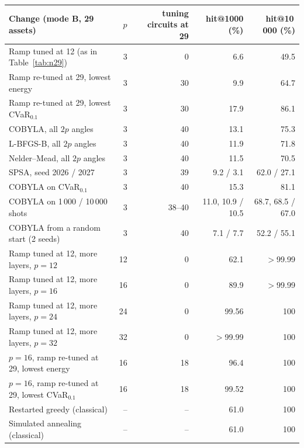 \begin{tabular}{@{}lrrrr@{}}\toprule
Change (mode B, 29 assets) & $p$ & tuning circuits at 29 & hit@1000 (\%) & hit@10\,000 (\%)\\\midrule
Ramp tuned at 12 (as in Table~\ref{tab:n29}) & 3 & 0 & 6.6 & 49.5\\
Ramp re-tuned at 29, lowest energy & 3 & 30 & 9.9 & 64.7\\
Ramp re-tuned at 29, lowest CVaR$_{0.1}$ & 3 & 30 & 17.9 & 86.1\\
COBYLA, all $2p$ angles & 3 & 40 & 13.1 & 75.3\\
L-BFGS-B, all $2p$ angles & 3 & 40 & 11.9 & 71.8\\
Nelder--Mead, all $2p$ angles & 3 & 40 & 11.5 & 70.5\\
SPSA, seed 2026 / 2027 & 3 & 39 & 9.2 / 3.1 & 62.0 / 27.1\\
COBYLA on CVaR$_{0.1}$ & 3 & 40 & 15.3 & 81.1\\
COBYLA on 1\,000 / 10\,000 shots & 3 & 38--40 & 11.0, 10.9 / 10.5 & 68.7, 68.5 / 67.0\\
COBYLA from a random start (2 seeds) & 3 & 40 & 7.1 / 7.7 & 52.2 / 55.1\\
Ramp tuned at 12, more layers, $p=12$ & 12 & 0 & 62.1 & $>$99.99\\
Ramp tuned at 12, more layers, $p=16$ & 16 & 0 & 89.9 & $>$99.99\\
Ramp tuned at 12, more layers, $p=24$ & 24 & 0 & 99.56 & 100\\
Ramp tuned at 12, more layers, $p=32$ & 32 & 0 & $>$99.99 & 100\\
$p=16$, ramp re-tuned at 29, lowest energy & 16 & 18 & 96.4 & 100\\
$p=16$, ramp re-tuned at 29, lowest CVaR$_{0.1}$ & 16 & 18 & 99.52 & 100\\
\midrule
Restarted greedy (classical) & -- & -- & 61.0 & 100\\
Simulated annealing (classical) & -- & -- & 61.0 & 100\\
\bottomrule
\end{tabular}

